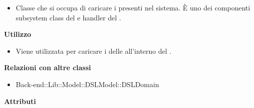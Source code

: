 					\begin{itemize}
						\item[] Classe che si occupa di caricare i  presenti nel sistema. È uno dei componenti subsystem class del   e handler del  .
					\end{itemize}      
				\textbf{Utilizzo}  
					\begin{itemize}
						\item[] Viene utilizzata per caricare i  delle  all'interno del .
					\end{itemize}
					\textbf{Relazioni con altre classi}
					\begin{itemize}
							\item{Back-end::Lib::Model::DSLModel::DSLDomain}
					\end{itemize}
			 \textbf{Attributi} 
	\begin{itemize}
		\end{itemize}
		
